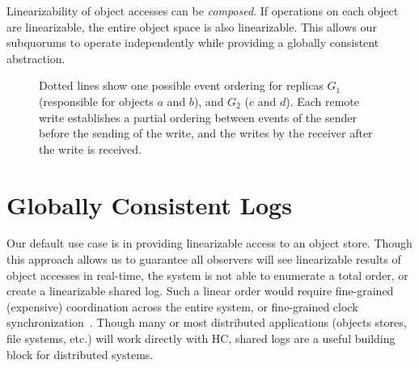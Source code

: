 \documentclass[letterpaper,10pt,twocolumn]{article}
\newcommand{\subs}{subquorums\xspace}
\begin{document}
Linearizability of object accesses can be \emph{composed}.
If operations on each object are linearizable, the entire object space is also
linearizable.
This allows our \subs to operate independently while providing a globally
consistent abstraction.

\begin{figure}[t]
\centering
{}
\hspace{.65in}
\caption{Dotted lines show one possible event ordering for replicas $G_1$ (responsible for
  objects $a$ and $b$), and $G_2$ ($c$ and $d$). Each remote write establishes a partial
  ordering between events of the sender before the sending of the write, and the writes by the receiver
  after the write is received.}
\label{fig:events}
\end{figure}

\section{Globally Consistent Logs}
\label{sec:log} Our default use case is in providing linearizable access to an
object store.
Though this approach allows us to guarantee all observers will see
linearizable results of object accesses in real-time, the system is not able to enumerate a
total order, or create a linearizable shared log.
Such a linear order would require fine-grained (expensive) coordination across
the entire system, or fine-grained clock synchronization~\cite{spanner}.
Though many or most distributed applications (objects stores, file systems,
etc.)
will work directly with HC, shared logs are a useful building block for
distributed systems.
\end{document}
